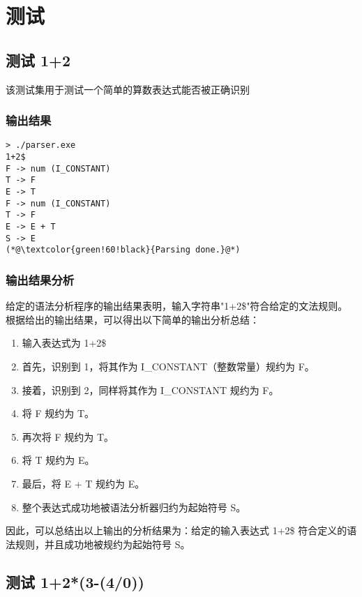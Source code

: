 \documentclass[lang=cn,11pt,a4paper]{elegantpaper}
\begin{document}
\section{测试}

\subsection{测试 1+2}
该测试集用于测试一个简单的算数表达式能否被正确识别

\subsubsection{输出结果}

\begin{lstlisting}[language=text]
> ./parser.exe
1+2$
F -> num (I_CONSTANT)        
T -> F
E -> T
F -> num (I_CONSTANT)        
T -> F
E -> E + T
S -> E
(*@\textcolor{green!60!black}{Parsing done.}@*)
\end{lstlisting}


\subsubsection{输出结果分析}

给定的语法分析程序的输出结果表明，输入字符串"1+2\$"符合给定的文法规则。根据给出的输出结果，可以得出以下简单的输出分析总结：
\begin{enumerate}
    \item 输入表达式为 1+2\$
    \item 首先，识别到 1，将其作为 I\_CONSTANT（整数常量）规约为 F。
    \item 接着，识别到 2，同样将其作为 I\_CONSTANT 规约为 F。
    \item 将 F 规约为 T。
    \item 再次将 F 规约为 T。
    \item 将 T 规约为 E。
    \item 最后，将 E + T 规约为 E。
    \item 整个表达式成功地被语法分析器归约为起始符号 S。
\end{enumerate}


因此，可以总结出以上输出的分析结果为：给定的输入表达式 1+2\$ 符合定义的语法规则，并且成功地被规约为起始符号 S。

\subsection{测试 1+2*(3-(4/0))}
\end{document}
